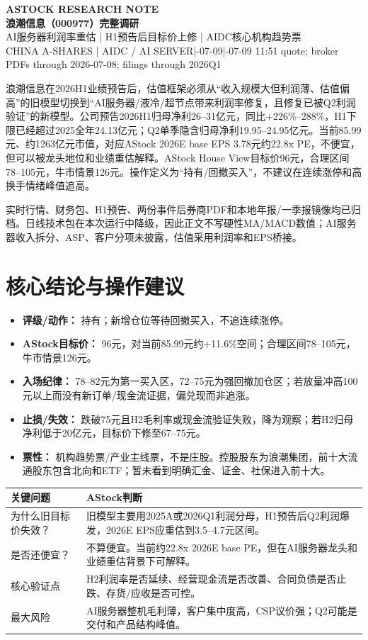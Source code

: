 \documentclass[a4paper,11pt,fontset=none]{ctexart}
\newcommand{\reporttitle}{浪潮信息（000977）完整调研}
\newcommand{\reportsubtitle}{AI服务器利润率重估 | H1预告后目标价上修 | AIDC核心机构趋势票}
\newcommand{\reportkicker}{ASTOCK RESEARCH NOTE}
\newcommand{\reportscope}{CHINA A-SHARES | AIDC / AI SERVER}
\newcommand{\reportdate}{2026-07-09}
\newcommand{\reportdatacutoff}{2026-07-09 11:51 quote; broker PDFs through 2026-07-08; filings through 2026Q1}
\newcommand{\reporthouseview}{%
浪潮信息在2026H1业绩预告后，估值框架必须从“收入规模大但利润薄、估值偏高”的旧模型切换到“AI服务器/液冷/超节点带来利润率修复，且修复已被Q2利润验证”的新模型。公司预告2026H1归母净利26--31亿元，同比+226\%--288\%，H1下限已经超过2025全年24.13亿元；Q2单季隐含归母净利19.95--24.95亿元。当前85.99元、约1263亿元市值，对应AStock 2026E base EPS 3.78元约22.8x PE，不便宜，但可以被龙头地位和业绩重估解释。AStock House View目标价96元，合理区间78--105元，牛市情景126元。操作定义为“持有/回撤买入”，不建议在连续涨停和高换手情绪峰值追高。%
}
\newcommand{\reportquality}{实时行情、财务包、H1预告、两份事件后券商PDF和本地年报/一季报镜像均已归档。日线技术包在本次运行中降级，因此正文不写硬性MA/MACD数值；AI服务器收入拆分、ASP、客户分项未披露，估值采用利润率和EPS桥接。}
\begin{document}
\begin{center}
{\sffamily\small\bfseries\color{steelgrey} \reportkicker}\\[3pt]
{\LARGE\bfseries\color{navy} \reporttitle}\\[5pt]
{\large\color{steelgrey} \reportsubtitle}\\[4pt]
{\small\color{mutedgrey} \reportscope \quad|\quad \reportdate \quad|\quad \reportdatacutoff}
\end{center}
\vspace{0.7em}

\begin{dashboardbox}
\begin{houseviewbox}
\reporthouseview
\end{houseviewbox}
\begin{sourcequalitybox}
\reportquality
\end{sourcequalitybox}
\end{dashboardbox}

\section{核心结论与操作建议}

\begin{riskbox}[投资结论]
\begin{itemize}
  \item \textbf{评级/动作：} 持有；新增仓位等待回撤买入，不追连续涨停。
  \item \textbf{AStock目标价：} 96元，对当前85.99元约+11.6\%空间；合理区间78--105元，牛市情景126元。
  \item \textbf{入场纪律：} 78--82元为第一买入区，72--75元为强回撤加仓区；若放量冲高100元以上而没有新订单/现金流证据，偏兑现而非追涨。
  \item \textbf{止损/失效：} 跌破75元且H2毛利率或现金流验证失败，降为观察；若H2归母净利低于20亿元，目标价下修至67--75元。
  \item \textbf{票性：} 机构趋势票/产业主线票，不是庄股。控股股东为浪潮集团，前十大流通股东包含北向和ETF；暂未看到明确汇金、证金、社保进入前十大。
\end{itemize}
\end{riskbox}

\noindent\begin{tabularx}{\textwidth}{L{3.8cm}X}
\toprule
\textbf{关键问题} & \textbf{AStock判断} \\
\midrule
为什么旧目标价失效？ & 旧模型主要用2025A或2026Q1利润分母，H1预告后Q2利润爆发，2026E EPS应重估到3.5--4.7元区间。 \\
是否还便宜？ & 不算便宜。当前约22.8x 2026E base PE，但在AI服务器龙头和业绩重估背景下可解释。 \\
核心验证点 & H2利润率是否延续、经营现金流是否改善、合同负债是否止跌、存货/应收是否可控。 \\
最大风险 & AI服务器整机毛利薄，客户集中度高，CSP议价强；Q2可能是交付和产品结构峰值。 \\
\bottomrule
\end{tabularx}
\end{document}

